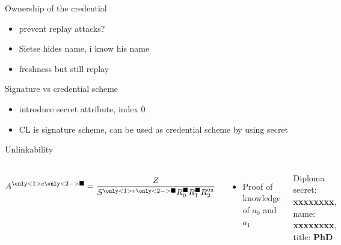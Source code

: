 \begin{frame}{Ownership of the credential}
{\begin{itemize}
      \item prevent replay attacks?
      \item Sietse hides name, i know his name
      \item freshness but still replay
    \end{itemize}
    \vspace{1em}
    Signature vs credential scheme
    \begin{itemize}
      \item introduce secret attribute, index 0
      \item CL is signature scheme, can be used as credential scheme by using secret
    \end{itemize}
  }
\end{frame}

\begin{frame}{Unlinkability}
  \vspace{2em}
  \begin{columns}[onlytextwidth]
      $$ A^{\only<1>{e}\only<2->{\blacksquare}} = \frac{Z}{S_{\makebox[0pt]{\color{white}.}}^{\only<1>{v}\only<2->{\blacksquare}} R_0^{\blacksquare} R_1^{\blacksquare} R_2^{a_2}} $$
      \begin{itemize}
        \item Proof of knowledge of $a_0$ and $a_1$
      \end{itemize}
      \begin{minipage}[t][3cm][t]{4cm}
        \begin{block}{Diploma}
          \vspace{0.5em}
          secret: \textbf{xxxxxxxx}, \\
          name: \textbf{xxxxxxxx}, \\
          title: \textbf{PhD}
          \vspace{0.5em}
        \end{block}
\end{minipage}
\end{columns}
\end{frame}
